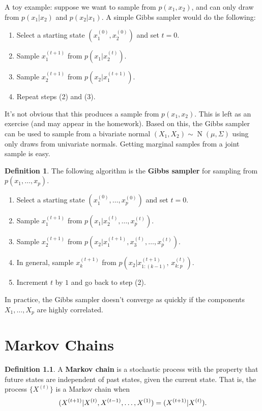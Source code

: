 \documentclass[article]{memoir}
\let\Pr\relax%
\DeclareMathOperator{\Pr}{\mathbb{P}}
\DeclareMathOperator{\1}{\mathbf{1}}
\newcommand{\dist}[1]{\operatorname{#1}}
\theoremstyle{definition}
\newtheorem{defi}{Definition}[chapter]
\begin{document}
A toy example: suppose we want to sample from $p(x_1, x_2)$, and can only
draw from $p(x_1 \vert x_2)$ and $p(x_2 \vert x_1)$. A simple Gibbs sampler
would do the following:
    \begin{enumerate}
    \item
    Select a starting state $(x_1^{(0)}, x_2^{(0)})$ and set $t = 0$.
    \item
    Sample $x_1^{(t+1)}$ from $p(x_1 \vert x_2^{(t)})$.
    \item
    Sample $x_2^{(t+1)}$ from $p(x_2 \vert x_1^{(t+1)})$.
    \item
    Repeat steps (2) and (3).
    \end{enumerate}
It's not obvious that this produces a sample from $p(x_1, x_2)$. This is left
as an exercise (and may appear in the homework). Based on this, the Gibbs
sampler can be used to sample from a bivariate normal
$(X_1, X_2) \sim \dist{N}(\mu, \Sigma)$ using only draws from univariate
normals. Getting marginal samples from a joint sample is easy.

    \begin{defi}
    The following algorithm is the \textbf{Gibbs sampler} for sampling from 
    $p(x_1, \ldots, x_p)$.
        \begin{enumerate}
        \item
        Select a starting state $(x_1^{(0)}, \ldots, x_p^{(0)})$ and set 
        $t = 0$.
        \item
        Sample $x_1^{(t+1)}$ from 
        $p(x_1 \vert x_2^{(t)}, \ldots, x_p^{(t)})$.
        \item
        Sample $x_2^{(t+1)}$ from 
        $p(x_2 \vert x_1^{(t+1)}, x_3^{(t)}, \ldots, x_p^{(t)})$.
        \item
        In general, sample $x_k^{(t+1)}$ from 
        $p(x_2 \vert x^{(t+1)}_{1:(k-1)}, \,x^{(t)}_{k:p})$.
        \item
        Increment $t$ by $1$ and go back to step (2).
        \end{enumerate}
    In practice, the Gibbs sampler doesn't converge as quickly if the
    components $X_1, \ldots, X_p$ are highly correlated.
    \end{defi}

\chapter{Markov Chains}
    \begin{defi}
    A \textbf{Markov chain} is a stochastic process with the property that
    future states are independent of past states, given the current state.
    That is, the process $\{X^{(t)}\}$ is a Markov chain when
        \[
        \Pr(X^{(t+1)} \vert X^{(t)}, X^{(t-1)}, \ldots, X^{(1)})
        =
        \Pr(X^{(t+1)} \vert X^{(t)}).
        \]
    \end{defi}
\end{document}

